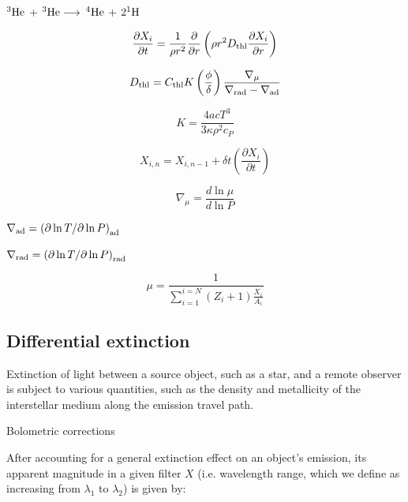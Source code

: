\documentclass[usenatbib]{mnras}
\begin{document}
$^{3}\textnormal{He}$ + $^{3}\textnormal{He} \longrightarrow$ $^{4}\textnormal{He}$ + $2^{1}\textnormal{H}$

\begin{equation}
\frac{\partial X_{i}}{\partial t} = \frac{1}{\rho r^{2}}\frac{\partial}{\partial r} \left( \rho r^{2} D_{\textnormal{thl}} \frac{\partial X_{i}}{\partial r} \right)
\label{diffusion_eq}
\end{equation}

\begin{equation}
D_{\textnormal{thl}} = C_{\textnormal{thl}} K \left( \frac{\phi}{\delta} \right) \frac{\nabla _{\mu}}{\nabla _{\textnormal{rad}} - \nabla _{\textnormal{ad}}}
\label{Dthl_def}
\end{equation}

\begin{equation}
K = \frac{4acT^{3}}{3\kappa\rho ^{2}c_{P}}
\label{diffusivity_def}
\end{equation}

\begin{equation}
X_{i,n} = X_{i,n-1} + \delta t \left( \frac{\partial X_{i}}{\partial t}\right)
\label{iter_timeind}
\end{equation}

\begin{equation}
\nabla _{\mu} = \frac{d\ln\mu}{d\ln P}
\label{del_mu_def}
\end{equation}


$\nabla _{\textnormal{ad}} = \left(\partial\ln T / \partial\ln P \right)_{\textnormal{ad}}$

$\nabla _{\textnormal{rad}} = \left(\partial\ln T / \partial\ln P \right)_{\textnormal{rad}}$

\begin{equation}
\mu = \frac{1}{\sum_{i=1}^{i=N} (Z_{i}+1) \frac{X_{i}}{A_{i}}}
\label{mol_weight_def}
\end{equation}



\subsection{Differential extinction}
Extinction of light between a source object, such as a star, and a remote observer is subject to various quantities, such as the density and metallicity of the interstellar medium along the emission travel path.

Bolometric corrections

After accounting for a general extinction effect on an object's emission, its apparent magnitude in a given filter $X$ (i.e. wavelength range, which we define as increasing from $\lambda _{1}$ to $\lambda _{2}$) is given by:
\end{document}
